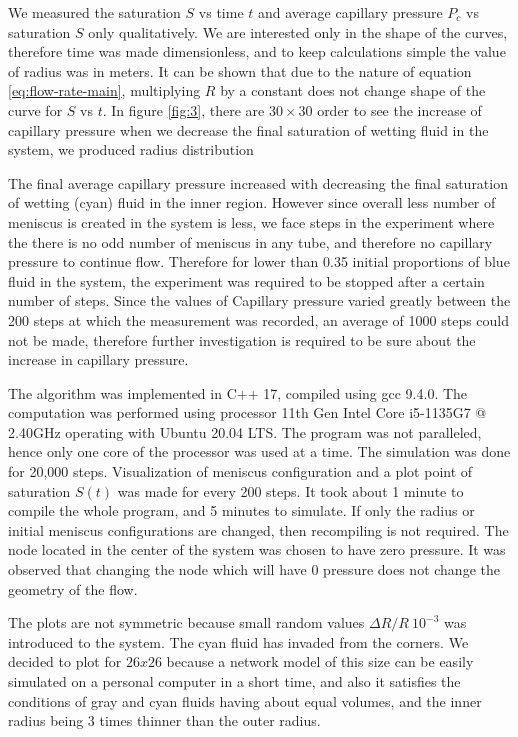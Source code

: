 \documentclass[
	12pt
] {article}
\begin{document}
	We measured the saturation $S$ vs time $t$ and average capillary pressure $P_c$ vs saturation $S$ only qualitatively. We are interested only in the shape of the curves, therefore time was made dimensionless, and to keep calculations simple the value of radius was in meters. It can be shown that due to the nature of equation \ref{eq:flow-rate-main}, multiplying $R$ by a constant does not change shape of the curve for $S$ vs $t$. In figure \ref{fig:3}, there are $30 \times 30$ order to see the increase of capillary pressure when we decrease the final saturation of wetting fluid in the system, we produced radius distribution 
	
	The final average capillary pressure increased with decreasing the final saturation of wetting (cyan) fluid in the inner region. However since overall less number of meniscus is created in the system is less, we face steps in the experiment where the there is no odd number of meniscus in any tube, and therefore no capillary pressure to continue flow. Therefore for lower than 0.35 initial proportions of blue fluid in the system, the experiment was required to be stopped after a certain number of steps. Since the values of Capillary pressure varied greatly between the 200 steps at which the measurement was recorded, an average of 1000 steps could not be made, therefore further investigation is required to be sure about the increase in capillary pressure.
	
	The algorithm was implemented in C++ 17, compiled using gcc 9.4.0. The computation was performed using processor 11th Gen Intel Core i5-1135G7 @ 2.40GHz operating with Ubuntu 20.04 LTS. The program was not paralleled, hence only one core of the processor was used at a time. The simulation was done for 20,000 steps. Visualization of meniscus configuration and a plot point of saturation $S(t)$ was made for every 200 steps. It took about 1 minute to compile the whole program, and 5 minutes to simulate. If only the radius or initial meniscus configurations are changed, then recompiling is not required. The node located in the center of the system was chosen to have zero pressure. It was observed that changing the node which will have 0 pressure does not change the geometry of the flow.
	
	The plots are not symmetric because small random values $\Delta R / R ~ 10^{-3}$ was introduced to the system. The cyan fluid has invaded from the corners. We decided to plot for $26 x 26$ because a network model of this size can be easily simulated on a personal computer in a short time, and also it satisfies the conditions of gray and cyan fluids having about equal volumes, and the inner radius being 3 times thinner than the outer radius.
		
\end{document}
